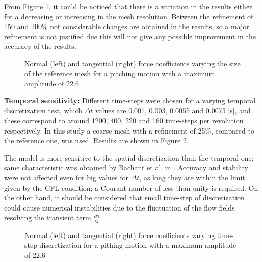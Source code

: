 \documentclass[a4paper]{jpconf}
\begin{document}
From Figure \ref{figmesh}, it could be noticed that there is a  variation in the results either for a decreasing or increasing in the mesh resolution. Between the refinement of 150 and 200\% not considerable changes are obtained in the results, so a major refinement is not justified due this will not give any possible improvement in the accuracy of the results.

\begin{figure}[h]
\begin{minipage}{18pc}
\resizebox{\columnwidth}{!}{}
\end{minipage}\hspace{2pc}%
\begin{minipage}{18pc}
\resizebox{\columnwidth}{!}{}
\end{minipage}
\caption{\label{figmesh}Normal (left) and tangential (right) force coefficients varying the size of the reference mesh for a pitching motion with a maximum amplitude of 22.6\degree\ }
\end{figure}

\textbf{Temporal sensitivity:} Different time-steps were chosen for a varying temporal discretization test, which $\Delta t$ values are 0.001, 0.003, 0.0055 and 0.0075 [s], and these correspond to around 1200, 400, 220 and 160 time-steps per revolution respectively. In this study a coarse mesh with a refinement of 25\%, compared to the reference one, was used. Results are shown in Figure \ref{figdtcoarse}.

The model is more sensitive to the spatial discretization than the temporal one;
same characteristic was obtained by Bachant et al. in
\cite{Bachant2016-VAT-ALM}. Accuracy and stability were not affected even for
big values for $\Delta t$, as long they are within the limit given by the CFL
condition; a Courant number of less than unity is required. On the other hand,
it should be considered that small time-step of discretization could cause
numerical instabilities due to the fluctuation of the flow fields resolving the
transient term $\frac{\partial \alpha}{\partial t}$.

\begin{figure}[h]
\begin{minipage}{18pc}
\resizebox{\columnwidth}{!}{}
\end{minipage}\hspace{2pc}%
\begin{minipage}{18pc}
\resizebox{\columnwidth}{!}{}
\end{minipage}
\caption{\label{figdtcoarse}Normal (left) and tangential (right) force coefficients varying time-step discretization for a pithing motion with a maximum amplitude of 22.6\degree\ }
\end{figure}
\end{document}
